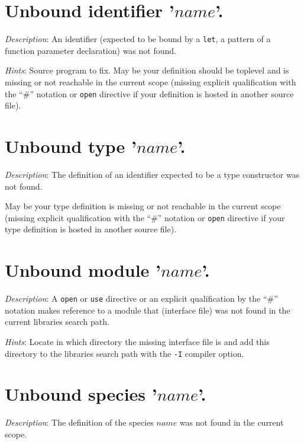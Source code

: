 \section*{Unbound identifier '$name$'.}
{\em Description}: An identifier (expected to be bound by a {\tt let},
a pattern of a function parameter declaration) was not found.

{\em Hints}: Source program to fix. May be your definition should be
toplevel and is missing or not reachable in the current scope (missing
explicit qualification with the ``\#'' notation or {\tt open}
directive if your definition is hosted in another source file).



\section*{Unbound type '$name$'.}
{\em Description}: The definition of an identifier expected to be a
type constructor was not found.

May be your type definition is missing or not reachable in the current
scope (missing explicit qualification with the ``\#'' notation or
{\tt open} directive if your type definition is hosted in another
source file).



\section*{Unbound module '$name$'.}
{\em Description}: A {\tt open} or {\tt use} directive or an explicit
qualification by the ``\#'' notation makes reference to a module that
(interface file) was not found in the current libraries search path.

{\em Hints}: Locate in which directory the missing interface file is
and add this directory to the libraries search path with the {\tt -I}
compiler option.



\section*{Unbound species '$name$'.}
{\em Description}: The definition of the species $name$ was not found
in the current scope.

